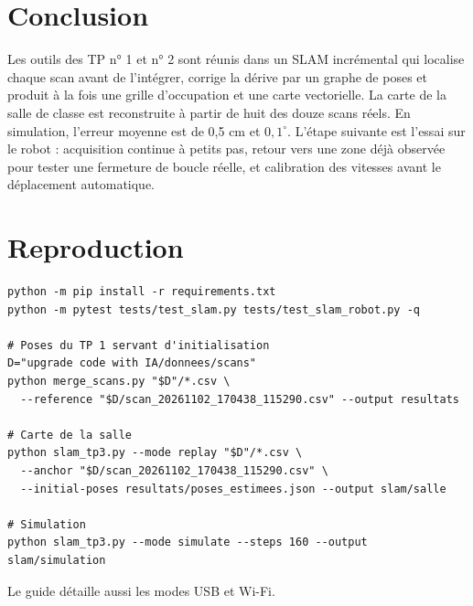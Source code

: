 \documentclass[11pt,a4paper]{article}
\newcommand{\code}[1]{\texttt{\detokenize{#1}}}
\begin{document}
\section*{Conclusion}
Les outils des TP n° 1 et n° 2 sont réunis dans un SLAM incrémental qui
localise chaque scan avant de l'intégrer, corrige la dérive par un graphe de
poses et produit à la fois une grille d'occupation et une carte vectorielle.
La carte de la salle de classe est reconstruite à partir de huit des douze
scans réels. En simulation, l'erreur moyenne est de 0,5 cm et $0{,}1^\circ$.
L'étape suivante est l'essai sur le robot : acquisition continue à petits pas,
retour vers une zone déjà observée pour tester une fermeture de boucle réelle,
et calibration des vitesses avant le déplacement automatique.

\clearpage
\appendix
\section{Reproduction}
\begin{lstlisting}
python -m pip install -r requirements.txt
python -m pytest tests/test_slam.py tests/test_slam_robot.py -q

# Poses du TP 1 servant d'initialisation
D="upgrade code with IA/donnees/scans"
python merge_scans.py "$D"/*.csv \
  --reference "$D/scan_20261102_170438_115290.csv" --output resultats

# Carte de la salle
python slam_tp3.py --mode replay "$D"/*.csv \
  --anchor "$D/scan_20261102_170438_115290.csv" \
  --initial-poses resultats/poses_estimees.json --output slam/salle

# Simulation
python slam_tp3.py --mode simulate --steps 160 --output slam/simulation
\end{lstlisting}
Le guide \code{JOUR3_SLAM.md} détaille aussi les modes USB et Wi-Fi.
\end{document}
